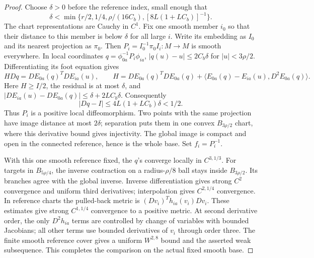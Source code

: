 \documentclass[11pt]{article}
\numberwithin{equation}{section}
\theoremstyle{definition}
\theoremstyle{remark}
\begin{document}
\begin{proof}
Choose \(\delta>0\) before the reference index, small enough that
\[
 \delta<\min\{r/2,1/4,\rho/(16C_b),[8L(1+LC_b)]^{-1}\}.
\]
The chart representations are Cauchy in \(C^1\). Fix one smooth
member \(i_0\) so that their distance to this member is below
\(\delta\) for all large \(i\). Write its embedding as \(I_0\)
and its nearest projection as \(\pi_0\). Then
\(P_i=I_0^{-1}\pi_0 I_i:M\to M\) is smooth everywhere.
In local coordinates \(q=\phi_{0a}^{-1}P_i\phi_{ia}\),
\(|q(u)-u|\le2C_b\delta\) for \(|u|<3\rho/2\).
Differentiating its foot equation gives
\[
 H Dq=DE_{0a}(q)^TDE_{ia}(u),\qquad
 H=DE_{0a}(q)^TDE_{0a}(q)
       +\langle E_{0a}(q)-E_{ia}(u),D^2E_{0a}(q)\rangle.
\]
Here \(H\ge I/2\), the residual is at most \(\delta\),
and \(|DE_{ia}(u)-DE_{0a}(q)|\le\delta+2LC_b\delta\).
Consequently
\[
 |Dq-I|\le4L(1+LC_b)\delta<1/2.
\]
Thus \(P_i\) is a positive local diffeomorphism. Two points
with the same projection have image distance at most \(2\delta\);
separation puts them in one convex \(B_{3\rho/2}\) chart,
where this derivative bound gives injectivity. The global
image is compact and open in the connected reference, hence
is the whole base. Set \(f_i=P_i^{-1}\).

With this one smooth reference fixed, the \(q\)'s converge
locally in \(C^{3,1/3}\). For targets in \(B_{5\rho/4}\),
the inverse contraction on a radius-\(\rho/8\) ball stays
inside \(B_{3\rho/2}\). Its branches agree with the global
inverse. Inverse differentiation gives strong \(C^2\)
convergence and uniform third derivatives; interpolation gives
\(C^{2,1/4}\) convergence. In reference charts the pulled-back
metric is \((Dv_i)^T h_{ia}(v_i)Dv_i\). These estimates give
strong \(C^{1,1/4}\) convergence to a positive metric.
At second derivative order, the only \(D^2h_{ia}\) terms
are controlled by change of variables with bounded Jacobians;
all other terms use bounded derivatives of \(v_i\) through
order three. The finite smooth reference cover gives a uniform
\(W^{2,8}\) bound and the asserted weak subsequence. This
completes the comparison on the actual fixed smooth base.
\end{proof}
\end{document}
